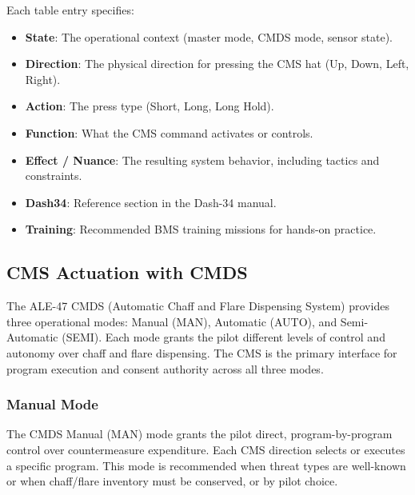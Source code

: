 \documentclass[11pt,a4paper]{article}
\begin{document}
Each table entry specifies:

\begin{itemize}
\item \textbf{State}: The operational context (master mode, CMDS mode, sensor state).
\item \textbf{Direction}: The physical direction for pressing the CMS hat (Up, Down, Left, Right).
\item \textbf{Action}: The press type (Short, Long, Long Hold).
\item \textbf{Function}: What the CMS command activates or controls.
\item \textbf{Effect / Nuance}: The resulting system behavior, including tactics and constraints.
\item \textbf{Dash34}: Reference section in the Dash-34 manual.
\item \textbf{Training}: Recommended BMS training missions for hands-on practice.
\end{itemize}


\subsection{CMS Actuation with CMDS}
\label{sec:C5-S2-S1-cms-cmds}

The ALE-47 CMDS (Automatic Chaff and Flare Dispensing System) provides three operational modes: Manual (MAN), Automatic (AUTO), and Semi-Automatic (SEMI). Each mode grants the pilot different levels of control and autonomy over chaff and flare dispensing. The CMS is the primary interface for program execution and consent authority across all three modes.


\subsubsection{Manual Mode}
\label{sec:C5-S2-S1-S1-cms-cmds-man}

The CMDS Manual (MAN) mode grants the pilot direct, program-by-program control over countermeasure expenditure. Each CMS direction selects or executes a specific program. This mode is recommended when threat types are well-known or when chaff/flare inventory must be conserved, or by pilot choice.
\end{document}
